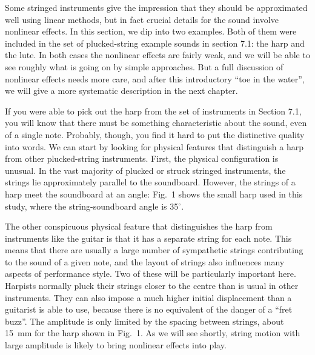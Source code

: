 

  Some stringed instruments give the impression that they should be 
  approximated well using linear methods, but in fact crucial details for the 
  sound involve nonlinear effects. In this section, we dip into two examples. 
  Both of them were included in the set of plucked-string example sounds in 
  section 7.1: the harp and the lute. In both cases the nonlinear effects are 
  fairly weak, and we will be able to see roughly what is going on by simple 
  approaches. But a full discussion of nonlinear effects needs more care, and 
  after this introductory “toe in the water”, we will give a more systematic 
  description in the next chapter. 

  If you were able to pick out the harp from the set of instruments in Section 
  7.1, you will know that there must be something characteristic about the 
  sound, even of a single note. Probably, though, you find it hard to put the 
  distinctive quality into words. We can start by looking for physical features 
  that distinguish a harp from other plucked-string instruments. First, the 
  physical configuration is unusual. In the vast majority of plucked or struck 
  stringed instruments, the strings lie approximately parallel to the 
  soundboard. However, the strings of a harp meet the soundboard at an angle: 
  Fig.\ 1 shows the small harp used in this study, where the string-soundboard 
  angle is 35$^\circ$. 

  The other conspicuous physical feature that distinguishes the harp from 
  instruments like the guitar is that it has a separate string for each note. 
  This means that there are usually a large number of sympathetic strings 
  contributing to the sound of a given note, and the layout of strings also 
  influences many aspects of performance style. Two of these will be 
  particularly important here. Harpists normally pluck their strings closer to 
  the centre than is usual in other instruments. They can also impose a much 
  higher initial displacement than a guitarist is able to use, because there is 
  no equivalent of the danger of a “fret buzz”. The amplitude is only limited 
  by the spacing between strings, about 15~mm for the harp shown in Fig.\ 1. As 
  we will see shortly, string motion with large amplitude is likely to bring 
  nonlinear effects into play. 


